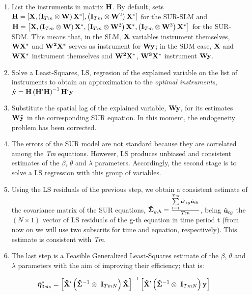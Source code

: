 \documentclass[article]{jss}
\begin{document}
\begin{enumerate}
\def\labelenumi{\arabic{enumi}.}
\item
  List the instruments in matrix \(\bf H\). By default,  sets \({\bf H}=[{\bf X},\left( {\bf I}_{Tm} \otimes {\bf W}\right){\bf X}^*], \left( {\bf I}_{Tm} \otimes {\bf W}^{2} \right){\bf X}^*]\) for the SUR-SLM and \({\bf H}=\left[{\bf X},\left( {\bf I}_{Tm} \otimes {\bf W}\right){\bf X}^*,\left( {\bf I}_{Tm} \otimes {\bf W}^{2} \right){\bf X}^*, \left( {\bf I}_{Tm} \otimes {\bf W}^{3} \right){\bf X}^*\right]\) for the SUR-SDM. This means that, in the SLM, \(\bf X\) variables instrument themselves, \(\bf WX^*\) and \(\bf W^2X^*\) serves as instrument for \(\bf Wy\); in the SDM case, \(\bf X\) and \(\bf WX^*\) instrument themselves and \(\bf W^2X^*\), \(\bf W^3X^*\) instrument \(\bf Wy\).
\item
  Solve a Least-Squares, LS, regresion of the explained variable on the list of instruments to obtain an approximation to the \emph{optimal instruments}, \(\hat{{\bf y}} = {\bf H}\left( {\bf H'H} \right)^{-1} {\bf H'} {{\bf y}}\)
\item
  Substitute the spatial lag of the explained variable, \({\bf Wy}\), for its estimates \({\bf W\hat{y}}\) in the corresponding SUR equation. In this moment, the endogeneity problem has been corrected.
\item
  The errors of the SUR model are not standard because they are correlated among the \emph{Tm} equations. However, LS produces unbiased and consistent estimates of the \(\beta\), \(\theta\) and \(\lambda\) parameters. Accordingly, the second stage is to solve a LS regression with this group of variables.
\item
  Using the LS residuals of the previous step, we obtain a consistent estimate of the covariance matrix of the SUR equations, \({\bf \hat{\Sigma}}_{g,h} = \frac{ \sum\limits_{t=1}^{Tm} \hat{{\bf u}'}_{tg}\hat{{\bf u}}_{th}} {Tm}\), being \(\hat{{\bf u}}_{tg}\) the \((N \times 1)\) vector of LS residuals of the g-th equation in time period t (from now on we will use two subscrits for time and equation, respectively). This estimate is consistent with \emph{Tm}.
\item
  The last step is a Feasible Generalized Least-Squares estimate of the \(\beta\), \(\theta\) and \(\lambda\) parameters with the aim of improving their efficiency; that is:
\end{enumerate}

\begin{equation}
  \hat{{\boldsymbol \eta}}_{3sls}^{*}=\left[{\bf \hat{X}}'\left({\bf \hat{\Sigma}}^{-1} \otimes\ {\bf I}_{TmN} \right) {\bf \hat{X}}\right]^{-1} \left[{\bf \hat{X}}'\left({\bf \hat{\Sigma}}^{-1} \otimes\ {\bf I}_{TmN}\right) {\bf y} \right]
\label{eq:3sls}
\end{equation}
\end{document}
